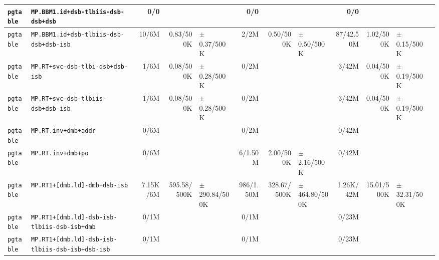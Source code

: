\begin{tabular}{l l  | r r l | r r l | r r l l}
        \verb|pgtable| &                    \verb|MP.BBM1.id+dsb-tlbiis-dsb-dsb+dsb| &            0/0 &                       &                   &            0/0 &                       &                   &            0/0 &                       &                    & \\ \hline 
        \verb|pgtable| &                \verb|MP.BBM1.id+dsb-tlbiis-dsb-dsb+dsb-isb| &          10/6M &             0.83/500K &   $\pm$ 0.37/500K &           2/2M &             0.50/500K &   $\pm$ 0.50/500K &      87/42.50M &             1.02/500K &    $\pm$ 0.15/500K & \\ \hline 
        \verb|pgtable| &                       \verb|MP.RT+svc-dsb-tlbi-dsb+dsb-isb| &           1/6M &             0.08/500K &   $\pm$ 0.28/500K &           0/2M &                       &                   &          3/42M &             0.04/500K &    $\pm$ 0.19/500K & \\ \hline 
        \verb|pgtable| &                     \verb|MP.RT+svc-dsb-tlbiis-dsb+dsb-isb| &           1/6M &             0.08/500K &   $\pm$ 0.28/500K &           0/2M &                       &                   &          3/42M &             0.04/500K &    $\pm$ 0.19/500K & \\ \hline 
        \verb|pgtable| &                                   \verb|MP.RT.inv+dmb+addr| &           0/6M &                       &                   &           0/2M &                       &                   &          0/42M &                       &                    & \\ \hline 
        \verb|pgtable| &                                     \verb|MP.RT.inv+dmb+po| &           0/6M &                       &                   &        6/1.50M &             2.00/500K &   $\pm$ 2.16/500K &          0/42M &                       &                    & \\ \hline 
        \verb|pgtable| &                          \verb|MP.RT1+[dmb.ld]-dmb+dsb-isb| &       7.15K/6M &           595.58/500K & $\pm$ 290.84/500K &      986/1.50M &           328.67/500K & $\pm$ 464.80/500K &      1.26K/42M &            15.01/500K &   $\pm$ 32.31/500K & \\ \hline 
        \verb|pgtable| &           \verb|MP.RT1+[dmb.ld]-dsb-isb-tlbiis-dsb-isb+dmb| &           0/1M &                       &                   &           0/1M &                       &                   &          0/23M &                       &                    & \\ \hline 
        \verb|pgtable| &       \verb|MP.RT1+[dmb.ld]-dsb-isb-tlbiis-dsb-isb+dsb-isb| &           0/1M &                       &                   &           0/1M &                       &                   &          0/23M &                       &                    & \\ \hline 

\end{tabular}
